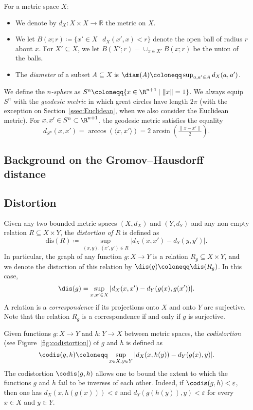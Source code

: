 \documentclass[11pt, reqno, english]{amsart}
\begin{document}
For a metric space $X$:
\begin{itemize}
\item
We denote by $d_{X} \colon X \times X \to \mathbb{R}$ the metric on $X$.
\item
We let $B(x;r)\coloneqq \{x'\in X~|~d_X(x',x)<r\}$ denote the open ball of radius $r$ about $x$.
For $X'\subseteq X$, we let $B(X';r)=\cup_{x\in X'}B(x;r)$ be the union of the balls.
\item
The \emph{diameter} of a subset $A \subseteq X$ is $\diam(A) \coloneqq \sup_{a, a' \in A} d_X(a, a')$.
\end{itemize}

We define the \emph{$n$-sphere} as $S^{n} \coloneqq \{x \in \R^{n + 1} \mid \|x\| = 1\}$.
We always equip $S^n$ with the \emph{geodesic metric} in which great circles have length $2\pi$ (with the exception on Section~\ref{ssec:Euclidean}, when we also consider the Euclidean metric).
For $x,x'\in S^n\subset \R^{n+1}$, the geodesic metric satisfies the equality
\[d_{S^n}(x,x')=\arccos\left(\langle x,x'\rangle\right)=2\arcsin\left(\tfrac{\|x-x'\|}{2}\right).\]


\subsection{Background on the Gromov--Hausdorff distance}
\label{ssec:background-gh}


\subsection*{Distortion}

Given any two bounded metric spaces $(X,d_X)$ and $(Y,d_Y)$ and any non-empty relation $R\subseteq X\times Y$, the \emph{distortion of $R$} is defined as 
\[\text{dis}(R)\coloneqq \sup_{(x,y),(x',y')\in R}\left|d_X(x,x')-d_Y(y,y')\right|.\]
In particular, the graph of any function $g\colon X\to Y$ is a relation $R_g\subseteq X\times Y$, and we denote the distortion of this relation by $\dis(g)\coloneqq \dis(R_g)$.
In this case, 
\[\dis(g)=\sup_{x,x'\in X}|d_{X}(x,x')-d_{Y}(g(x),g(x'))|.\]
A relation is a \emph{correspondence} if its projections onto $X$ and onto $Y$ are surjective.
Note that the relation $R_g$ is a correspondence if and only if $g$ is surjective.

Given functions $g \colon X \to Y$ and $h \colon Y \to X$ between metric spaces, the \emph{codistortion} (see Figure~\ref{fig:codistortion}) of $g$ and $h$ is defined as
\[\codis(g,h)\coloneqq\sup_{x\in X,y\in Y}|d_{X}(x,h(y))-d_{Y}(g(x),y)|.\]
The codistortion $\codis(g,h)$ allows one to bound the extent to which the functions $g$ and $h$ fail to be inverses of each other.
Indeed, if $\codis(g,h)<\varepsilon$, then one has $d_X(x,h(g(x)))<\varepsilon$ and $d_Y(g(h(y)),y)<\varepsilon$ for every $x\in X$ and $y\in Y$.
\end{document}
